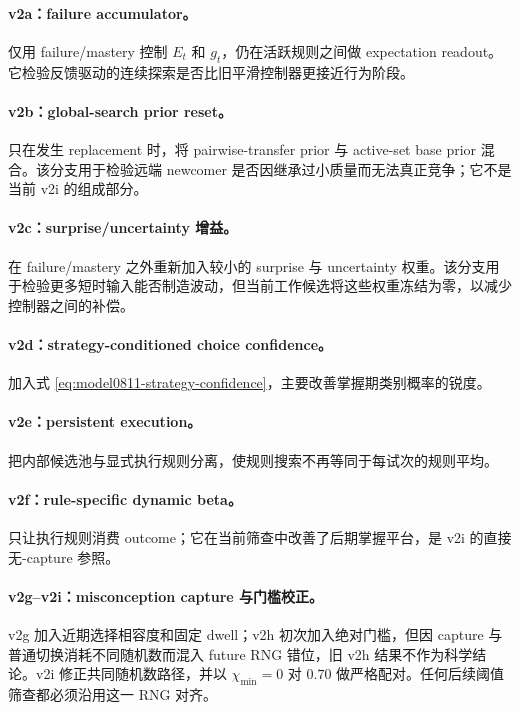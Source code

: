 \paragraph{v2a：failure accumulator。}
仅用 failure/mastery 控制 $E_t$ 和 $g_t$，仍在活跃规则之间做 expectation readout。它检验反馈驱动的连续探索是否比旧平滑控制器更接近行为阶段。

\paragraph{v2b：global-search prior reset。}
只在发生 replacement 时，将 pairwise-transfer prior 与 active-set base prior 混合。该分支用于检验远端 newcomer 是否因继承过小质量而无法真正竞争；它不是当前 v2i 的组成部分。

\paragraph{v2c：surprise/uncertainty 增益。}
在 failure/mastery 之外重新加入较小的 surprise 与 uncertainty 权重。该分支用于检验更多短时输入能否制造波动，但当前工作候选将这些权重冻结为零，以减少控制器之间的补偿。

\paragraph{v2d：strategy-conditioned choice confidence。}
加入式 \ref{eq:model0811-strategy-confidence}，主要改善掌握期类别概率的锐度。

\paragraph{v2e：persistent execution。}
把内部候选池与显式执行规则分离，使规则搜索不再等同于每试次的规则平均。

\paragraph{v2f：rule-specific dynamic beta。}
只让执行规则消费 outcome；它在当前筛查中改善了后期掌握平台，是 v2i 的直接无-capture 参照。

\paragraph{v2g--v2i：misconception capture 与门槛校正。}
v2g 加入近期选择相容度和固定 dwell；v2h 初次加入绝对门槛，但因 capture 与普通切换消耗不同随机数而混入 future RNG 错位，旧 v2h 结果不作为科学结论。v2i 修正共同随机数路径，并以
$\chi_{\min}=0$ 对 $0.70$ 做严格配对。任何后续阈值筛查都必须沿用这一 RNG 对齐。


